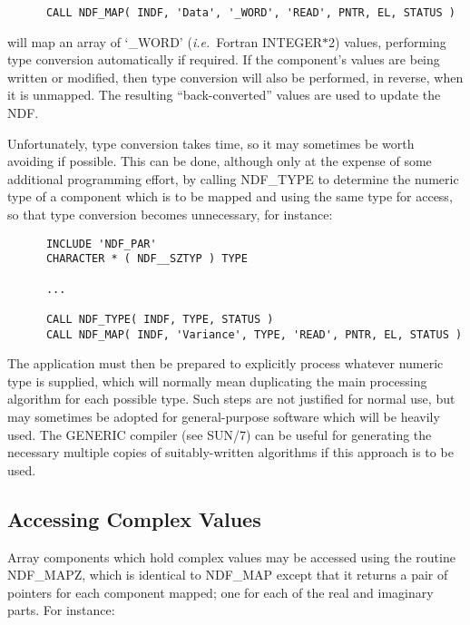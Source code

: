 \documentclass[twoside,11pt]{article}
\newcommand{\htmlref}[2]{#1}
\newcommand{\xref}[3]{#1}
\newcommand{\xlabel}[1]{}
\newcommand{\st}[1]{{\em{#1}}}
\begin{document}
\small
\begin{verbatim}
      CALL NDF_MAP( INDF, 'Data', '_WORD', 'READ', PNTR, EL, STATUS )
\end{verbatim}
\normalsize

will map an array of `\_WORD' (\st{i.e.}\ Fortran INTEGER$*$2) values,
performing type conversion automatically if required. 
If the component's values are being written or modified, then type
conversion will also be performed, in reverse, when it is unmapped. 
The resulting ``back-converted'' values are used to update the NDF. 

Unfortunately, type conversion takes time, so it may sometimes be worth
avoiding if possible.
This can be done, although only at the expense of some additional
programming effort, by calling \htmlref{NDF\_TYPE}{NDF_TYPE} to determine the numeric type of a
component which is to be mapped and using the same type for access, so that
type conversion becomes unnecessary, for instance: 

\small
\begin{verbatim}
      INCLUDE 'NDF_PAR'
      CHARACTER * ( NDF__SZTYP ) TYPE

      ...

      CALL NDF_TYPE( INDF, TYPE, STATUS )
      CALL NDF_MAP( INDF, 'Variance', TYPE, 'READ', PNTR, EL, STATUS )
\end{verbatim}
\normalsize

The application must then be prepared to explicitly process whatever numeric 
type is supplied, which will normally mean duplicating the main processing 
algorithm for each possible type.
Such steps are not justified for normal use, but may sometimes be adopted
for general-purpose software which will be heavily used. 
The GENERIC compiler (see \xref{SUN/7}{sun7}{}) can be useful for
generating the necessary multiple copies of suitably-written
algorithms if this approach is to be used.

\subsection{\xlabel{accessing_complex_values}\label{ss:complexaccess}Accessing Complex Values}

Array components which hold complex values may be accessed using the
routine \htmlref{NDF\_MAPZ}{NDF_MAPZ}, which is identical to \htmlref{NDF\_MAP}{NDF_MAP} except that it returns a
pair of pointers for each component mapped; one for each of the real and
imaginary parts. 
For instance: 
\end{document}
